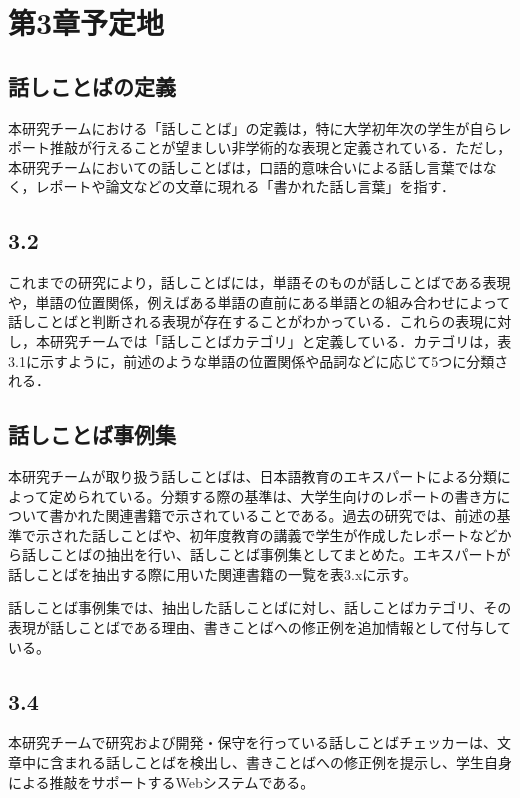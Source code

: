 \chapter{第3章予定地\label{c3}}


\section{話しことばの定義 \label{c3s1}}
本研究チームにおける「話しことば」の定義は，特に大学初年次の学生が自らレポート推敲が行えることが望ましい非学術的な表現と定義されている．ただし，本研究チームにおいての話しことばは，口語的意味合いによる話し言葉ではなく，レポートや論文などの文章に現れる「書かれた話し言葉」を指す．

\section{3.2 \label{c3s2}}
これまでの研究により，話しことばには，単語そのものが話しことばである表現や，単語の位置関係，例えばある単語の直前にある単語との組み合わせによって話しことばと判断される表現が存在することがわかっている．これらの表現に対し，本研究チームでは「話しことばカテゴリ」と定義している．カテゴリは，表3.1に示すように，前述のような単語の位置関係や品詞などに応じて5つに分類される．



\section{話しことば事例集 \label{c3s3}}
本研究チームが取り扱う話しことばは、日本語教育のエキスパートによる分類によって定められている。分類する際の基準は、大学生向けのレポートの書き方について書かれた関連書籍で示されていることである。過去の研究では、前述の基準で示された話しことばや、初年度教育の講義で学生が作成したレポートなどから話しことばの抽出を行い、話しことば事例集としてまとめた。エキスパートが話しことばを抽出する際に用いた関連書籍の一覧を表3.xに示す。



話しことば事例集では、抽出した話しことばに対し、話しことばカテゴリ、その表現が話しことばである理由、書きことばへの修正例を追加情報として付与している。

\section{3.4 \label{c3s4}}
本研究チームで研究および開発・保守を行っている話しことばチェッカーは、文章中に含まれる話しことばを検出し、書きことばへの修正例を提示し、学生自身による推敲をサポートするWebシステムである。

